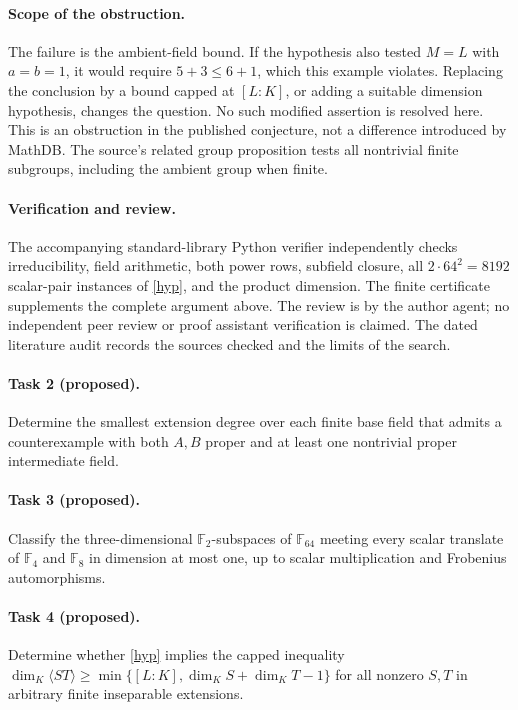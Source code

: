 \documentclass[11pt]{article}
\newcommand{\F}{\mathbb F}
\begin{document}
\paragraph{Scope of the obstruction.}
The failure is the ambient-field bound. If the hypothesis also tested
$M=L$ with $a=b=1$, it would require $5+3\le6+1$, which this example
violates. Replacing the conclusion by a bound capped at $[L:K]$, or
adding a suitable dimension hypothesis, changes the question. No such
modified assertion is resolved here. This is an obstruction in the
published conjecture, not a difference introduced by MathDB.
The source's related group proposition tests all nontrivial finite
subgroups, including the ambient group when finite.

\paragraph{Verification and review.}
The accompanying standard-library Python verifier independently checks
irreducibility, field arithmetic, both power rows, subfield closure, all
$2\cdot64^2=8192$ scalar-pair instances of \eqref{hyp}, and the product
dimension. The finite certificate supplements the complete argument above.
The review is by the author agent; no independent peer review or proof
assistant verification is claimed. The dated literature audit records
the sources checked and the limits of the search.

\paragraph{Task 2 (proposed).}
Determine the smallest extension degree over each finite base field that
admits a counterexample with both $A,B$ proper and at least one
nontrivial proper intermediate field.

\paragraph{Task 3 (proposed).}
Classify the three-dimensional $\F_2$-subspaces of $\F_{64}$ meeting
every scalar translate of $\F_4$ and $\F_8$ in dimension at most one,
up to scalar multiplication and Frobenius automorphisms.

\paragraph{Task 4 (proposed).}
Determine whether \eqref{hyp} implies the capped inequality
$\dim_K\langle ST\rangle\ge
\min\{[L:K],\dim_K S+\dim_K T-1\}$ for all nonzero $S,T$ in
arbitrary finite inseparable extensions.
\end{document}
